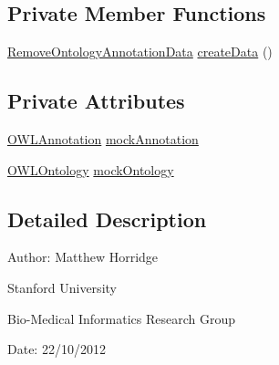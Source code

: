 \subsection*{Private Member Functions}
\begin{DoxyCompactItemize}
\item 
\hyperlink{classorg_1_1semanticweb_1_1owlapi_1_1change_1_1_remove_ontology_annotation_data}{Remove\-Ontology\-Annotation\-Data} \hyperlink{classorg_1_1semanticweb_1_1owlapi_1_1api_1_1test_1_1ontology_1_1_remove_ontology_annotation_data_test_case_a4e55906cf257f8510e10af1eeaf2a37a}{create\-Data} ()
\end{DoxyCompactItemize}
\subsection*{Private Attributes}
\begin{DoxyCompactItemize}
\item 
\hyperlink{interfaceorg_1_1semanticweb_1_1owlapi_1_1model_1_1_o_w_l_annotation}{O\-W\-L\-Annotation} \hyperlink{classorg_1_1semanticweb_1_1owlapi_1_1api_1_1test_1_1ontology_1_1_remove_ontology_annotation_data_test_case_aefe66ad01e3e6714683271ce853b4a45}{mock\-Annotation}
\item 
\hyperlink{interfaceorg_1_1semanticweb_1_1owlapi_1_1model_1_1_o_w_l_ontology}{O\-W\-L\-Ontology} \hyperlink{classorg_1_1semanticweb_1_1owlapi_1_1api_1_1test_1_1ontology_1_1_remove_ontology_annotation_data_test_case_afd37f162587761df89abac9d11b1afa1}{mock\-Ontology}
\end{DoxyCompactItemize}


\subsection{Detailed Description}
Author\-: Matthew Horridge\par
 Stanford University\par
 Bio-\/\-Medical Informatics Research Group\par
 Date\-: 22/10/2012 

